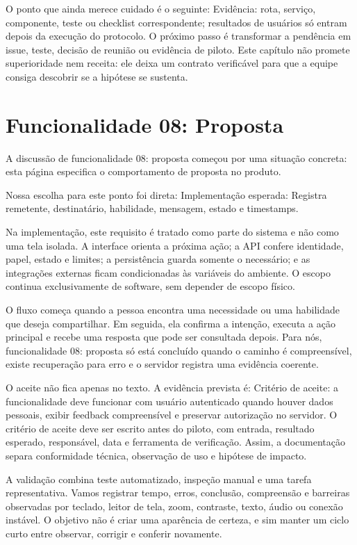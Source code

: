 \documentclass[12pt,oneside,a4paper,article]{abntex2}
\begin{document}
O ponto que ainda merece cuidado é o seguinte: Evidência: rota, serviço, componente, teste ou checklist correspondente; resultados de usuários só entram depois da execução do protocolo. O próximo passo é transformar a pendência em issue, teste, decisão de reunião ou evidência de piloto. Este capítulo não promete superioridade nem receita: ele deixa um contrato verificável para que a equipe consiga descobrir se a hipótese se sustenta.

\section{Funcionalidade 08: Proposta}
A discussão de funcionalidade 08: proposta começou por uma situação concreta: esta página especifica o comportamento de proposta no produto.

Nossa escolha para este ponto foi direta: Implementação esperada: Registra remetente, destinatário, habilidade, mensagem, estado e timestamps.

Na implementação, este requisito é tratado como parte do sistema e não como uma tela isolada. A interface orienta a próxima ação; a API confere identidade, papel, estado e limites; a persistência guarda somente o necessário; e as integrações externas ficam condicionadas às variáveis do ambiente. O escopo continua exclusivamente de software, sem depender de escopo físico.

O fluxo começa quando a pessoa encontra uma necessidade ou uma habilidade que deseja compartilhar. Em seguida, ela confirma a intenção, executa a ação principal e recebe uma resposta que pode ser consultada depois. Para nós, funcionalidade 08: proposta só está concluído quando o caminho é compreensível, existe recuperação para erro e o servidor registra uma evidência coerente.

O aceite não fica apenas no texto. A evidência prevista é: Critério de aceite: a funcionalidade deve funcionar com usuário autenticado quando houver dados pessoais, exibir feedback compreensível e preservar autorização no servidor. O critério de aceite deve ser escrito antes do piloto, com entrada, resultado esperado, responsável, data e ferramenta de verificação. Assim, a documentação separa conformidade técnica, observação de uso e hipótese de impacto.

A validação combina teste automatizado, inspeção manual e uma tarefa representativa. Vamos registrar tempo, erros, conclusão, compreensão e barreiras observadas por teclado, leitor de tela, zoom, contraste, texto, áudio ou conexão instável. O objetivo não é criar uma aparência de certeza, e sim manter um ciclo curto entre observar, corrigir e conferir novamente.
\end{document}
